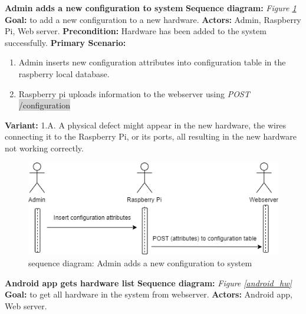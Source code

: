 \documentclass[12pt, oneside, a4paper]{book}
\newcommand{\code}[1]{{\color{red}\colorbox{lightgray}{#1}}}
\newcommand\boldcolor[1]{\textcolor{bold}{\textbf{#1}}}
\begin{document}
				\newpage\hspace*{-6mm}\boldcolor{Admin adds a new configuration to system}
				\newline\textbf{Sequence diagram:} \textit{Figure \ref{admin_config}}
				\newline\textbf{Goal:} to add a new configuration to a new hardware.
				\newline\textbf{Actors:} Admin, Raspberry Pi, Web server.
				\newline\textbf{Precondition:} Hardware has been added to the system successfully.
				\newline\textbf{Primary Scenario:}	
				\begin{enumerate}[label*=\arabic*.]
					\item Admin inserts new configuration attributes into configuration table in the raspberry local database. 
					\item Raspberry pi uploads information to the webserver using \textit{POST} \code{/configuration}
				\end{enumerate}
				\textbf{Variant:}\newline
				\hspace*{5mm}1.A. A physical defect might appear in the new hardware, the wires connecting it to the Raspberry Pi, or its ports, all resulting in the new hardware not working correctly. \\
				\begin{figure}[H]
					\includegraphics[width=\linewidth]{img/sequence_add_config.png}
					\caption{sequence diagram: Admin adds a new configuration to system}
					\label{admin_config}
				\end{figure}
				\newpage\hspace*{-6mm}\boldcolor{Android app gets hardware list}
				\newline\textbf{Sequence diagram:} \textit{Figure \ref{android_hw}}
				\newline\textbf{Goal:} to get all hardware in the system from webserver.
				\newline\textbf{Actors:} Android app, Web server.
\end{document}
